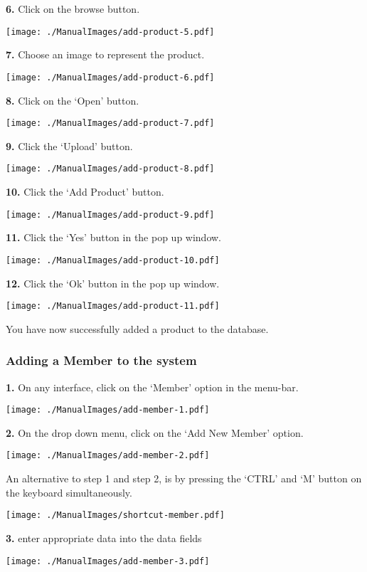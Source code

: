\textbf{6.} Click on the browse button.

\texttt{[image: ./ManualImages/add-product-5.pdf]}

\textbf{7.} Choose an image to represent the product.

\texttt{[image: ./ManualImages/add-product-6.pdf]}

\textbf{8.} Click on the `Open' button.

\texttt{[image: ./ManualImages/add-product-7.pdf]}

\textbf{9.} Click the `Upload' button.

\texttt{[image: ./ManualImages/add-product-8.pdf]}

\textbf{10.} Click the `Add Product' button.

\texttt{[image: ./ManualImages/add-product-9.pdf]}

\textbf{11.} Click the `Yes' button in the pop up window.

\texttt{[image: ./ManualImages/add-product-10.pdf]}

\textbf{12.} Click the `Ok' button in the pop up window.

\texttt{[image: ./ManualImages/add-product-11.pdf]}

You have now successfully added a product to the database.

\pagebreak
\subsubsection{Adding a Member to the system}
\label{fig:Adding a Member to the system}

\textbf{1.} On any interface, click on the `Member' option in the menu-bar.

\texttt{[image: ./ManualImages/add-member-1.pdf]}

\textbf{2.} On the drop down menu, click on the `Add New Member' option.

\texttt{[image: ./ManualImages/add-member-2.pdf]}

An alternative to step 1 and step 2, is by pressing the `CTRL' and `M' button on the keyboard simultaneously.

\texttt{[image: ./ManualImages/shortcut-member.pdf]}

\textbf{3.} enter appropriate data into the data fields

\texttt{[image: ./ManualImages/add-member-3.pdf]}

